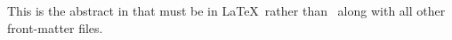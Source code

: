 This is the abstract in that must be in \LaTeX\ rather than \LyX\, along with all other front-matter files.